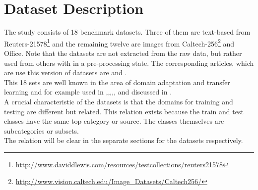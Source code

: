\section{Dataset Description}\label{EmSecDaDes}
The study consists of 18 benchmark datasets.
Three of them are text-based from Reuters-21578\footnote{\url{http://www.daviddlewis.com/resources/testcollections/reuters21578}} and the remaining twelve are images from Caltech-256\footnote{\url{http://www.vision.caltech.edu/Image\_Datasets/Caltech256/}} and Office.
Note that the datasets are not extracted from the raw data, but rather used from others with in a pre-processing state.
The corresponding articles, which are use this version of datasets are \cite{Gong.} and \cite{Long.2015}.
\\
This 18 sets are well known in the area of domain adaptation and transfer learning and for example used in 
\cite{Long.2015},\cite{Gong.},\cite{Fernando.},\cite{Long.},\cite{Dai.},\cite{Quattoni.} and discussed in \cite{Pan.2010}.\\
A crucial characteristic of the datasets is that the domains for training and testing are different but related.
This relation exists because the train and test classes have the same top category or source.
The classes themselves are subcategories or subsets.\cite{JingGao.2008}\\
The relation will be clear in the separate sections for the datasets respectively.

